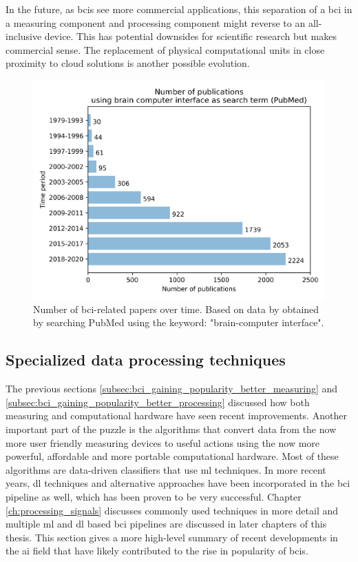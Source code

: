 In the future, as \glspl{bci} see more commercial applications, this separation of a \gls{bci} in a measuring component and processing component might reverse to an all-inclusive device.
This has potential downsides for scientific research but makes commercial sense.
The replacement of physical computational units in close proximity to cloud solutions is another possible evolution.

\begin{figure}[ht]
    \centering
    \includegraphics[width=0.8\linewidth]{../images/introduction/papers_on_bci.pdf}
    \captionsetup{width=0.7\linewidth}
    \captionsetup{justification=centering}
    \caption{Number of \gls{bci}-related papers over time. Based on data by \citet{bci_progress_overview} obtained by searching PubMed using the keyword: "brain-computer interface".}
    \label{fig:bci_publications}
\end{figure}



\subsection{Specialized data processing techniques}
\label{subsec:bci_gaining_popularity_improved_data_processing}


The previous sections \ref{subsec:bci_gaining_popularity_better_measuring} and \ref{subsec:bci_gaining_popularity_better_processing} discussed how both measuring and computational hardware have seen recent improvements.
Another important part of the puzzle is the algorithms that convert data from the now more user friendly measuring devices to useful actions using the now more powerful, affordable and more portable computational hardware.
Most of these algorithms are data-driven classifiers that use \gls{ml} techniques.
In more recent years, \gls{dl} techniques and alternative approaches have been incorporated in the \gls{bci} pipeline as well, which has been proven to be very successful. 
Chapter \ref{ch:processing_signals} discusses commonly used techniques in more detail and multiple \gls{ml} and \gls{dl} based \gls{bci} pipelines are discussed in later chapters of this thesis.
This section gives a more high-level summary of recent developments in the \gls{ai} field that have likely contributed to the rise in popularity of \glspl{bci}.

